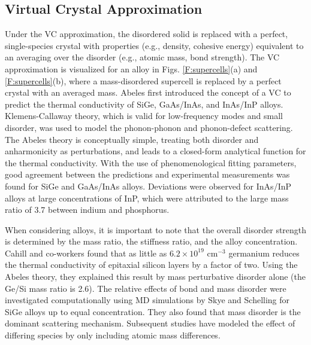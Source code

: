 \documentclass[aps,prb,onecolumn,preprint,footinbib,superscriptaddress,amsmath,amssymb,floatfix]{revtex4}
\begin{document}

\subsection{\label{S:Virtual Crystal}Virtual Crystal Approximation}

Under the VC approximation, the disordered solid is replaced with 
a perfect, single-species crystal with properties (e.g., density, 
cohesive energy) equivalent to an averaging over the disorder 
(e.g., atomic mass, bond strength).\cite{abeles_lattice_1963}
The VC approximation is visualized for an alloy in Figs. 
\ref{F:supercells}(a) and \ref{F:supercells}(b), where 
a mass-disordered supercell is replaced by a perfect 
crystal with an averaged mass. 
Abeles first introduced the concept of a VC to predict the
thermal conductivity of SiGe, GaAs/InAs, and InAs/InP alloys.
\cite{abeles_lattice_1963} Klemens-Callaway theory, 
which is valid for low-frequency modes and small disorder, was used to model 
the phonon-phonon and phonon-defect scattering.
\cite{abeles_lattice_1963,klemens_scattering_1955,klemens_thermal_1957,callaway_model_1959,mattis_phonon_1957,kamitakahara_vibrations_1974} 
The Abeles theory is conceptually simple, treating both
disorder and anharmonicity as perturbations, and leads to 
a closed-form analytical function for the thermal conductivity.
With the use of phenomenological  
fitting parameters, good agreement between the predictions and 
experimental measurements 
was found for SiGe and GaAs/InAs alloys. Deviations were observed 
for InAs/InP alloys at large concentrations of 
InP, which were attributed to the large mass ratio of 3.7 between 
indium and phosphorus.\cite{abeles_lattice_1963}

When considering alloys, it is important to note that 
the overall disorder strength is determined by the mass ratio, 
the stiffness ratio, and the alloy concentration.
Cahill and co-workers found that as little as 
$6.2\times10^{19}$ cm$^{-3}$ germanium reduces the thermal conductivity 
of epitaxial silicon layers by a factor of two.
\cite{cahill_thermal_2004}  
Using the Abeles theory, they explained this result 
by mass perturbative disorder alone (the Ge/Si mass ratio is 2.6).
\cite{cahill_thermal_2004,cahill_thermal_2005} 
The relative effects of bond and mass disorder were investigated 
computationally using MD simulations by Skye and 
Schelling for SiGe alloys up to equal concentration.
\cite{skye_thermal_2008} They also found that mass disorder is 
the dominant scattering mechanism. Subsequent studies have modeled the 
effect of differing species by only including 
atomic mass differences.\cite{landry_thermal_2009,tian_enhancing_2012}
\end{document}
